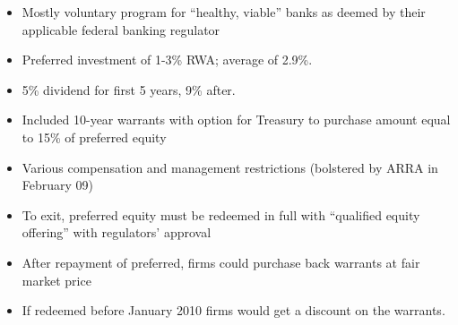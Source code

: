 \documentclass[8pt]{beamer}
\begin{document}
{\begin{columns}[T]
\begin{column}{.49\textwidth}
\begin{itemize}[label={--}]
\item Mostly voluntary program for ``healthy, viable'' banks as deemed by their applicable federal banking regulator
\item Preferred investment of 1-3\% RWA; average of 2.9\%.
\item 5\% dividend for first 5 years, 9\% after.
\item Included 10-year warrants with option for Treasury to purchase amount equal to 15\% of preferred equity
\item Various compensation and management restrictions (bolstered by ARRA in February 09)
\item To exit, preferred equity must be redeemed in full with ``qualified equity offering'' with regulators' approval
\item After repayment of preferred, firms could purchase back warrants at fair market price
\item If redeemed before January 2010 firms would get a discount on the warrants. 
 \end{itemize}

\end{column}%
\end{columns}
}
\end{document}

